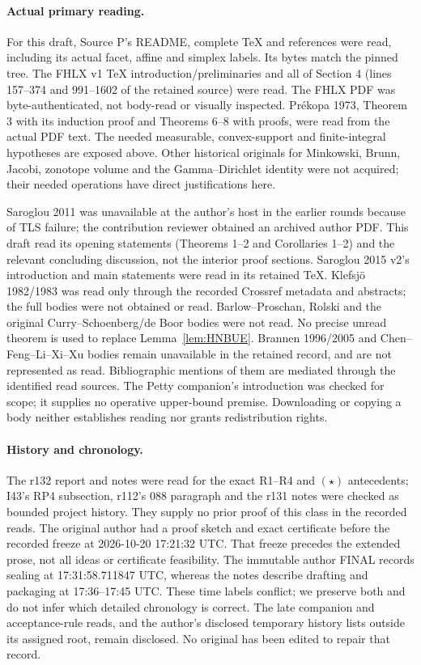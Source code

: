 \documentclass[11pt]{article}
\theoremstyle{remark}\newtheorem{remark}[theorem]{Remark}
\numberwithin{equation}{section}
\begin{document}
\paragraph{Actual primary reading.}
For this draft, Source P's README, complete TeX and references were read,
including its actual facet, affine and simplex labels. Its bytes match
the pinned tree. The FHLX v1 TeX introduction/preliminaries and all of
Section 4 (lines 157--374 and 991--1602 of the retained source) were read.
The FHLX PDF was byte-authenticated, not body-read or visually inspected.
Pr\'ekopa 1973, Theorem 3 with its induction proof and Theorems 6--8
with proofs, were read from the actual PDF text. The needed measurable,
convex-support and finite-integral hypotheses are exposed above.
Other historical originals for Minkowski, Brunn, Jacobi, zonotope volume
and the Gamma--Dirichlet identity were not acquired; their needed
operations have direct justifications here.

Saroglou 2011 was unavailable at the author's host in the earlier
rounds because of TLS failure; the contribution reviewer obtained an
archived author PDF. This draft read its opening statements (Theorems
1--2 and Corollaries 1--2) and the relevant concluding discussion, not
the interior proof sections. Saroglou 2015 v2's introduction and main
statements were read in its retained TeX. Klefsj\"o 1982/1983 was read
only through the recorded Crossref metadata and abstracts; the full
bodies were not obtained or read. Barlow--Proschan, Rolski and the
original Curry--Schoenberg/de Boor bodies were not read. No precise
unread theorem is used to replace Lemma~\ref{lem:HNBUE}.
Brannen 1996/2005 and Chen--Feng--Li--Xi--Xu bodies remain unavailable
in the retained record, and are not represented as read. Bibliographic
mentions of them are mediated through the identified read sources.
The Petty companion's introduction was checked for scope; it supplies
no operative upper-bound premise. Downloading or copying a body neither
establishes reading nor grants redistribution rights.

\paragraph{History and chronology.}
The r132 report and notes were read for the exact R1--R4 and $(\star)$
antecedents; I43's RP4 subsection, r112's 088 paragraph and the r131
notes were checked as bounded project history. They supply no prior
proof of this class in the recorded reads. The original author had a
proof sketch and exact certificate before the recorded freeze at
2026-10-20 17:21:32 UTC. That freeze precedes the extended prose, not
all ideas or certificate feasibility. The immutable author FINAL records
sealing at 17:31:58.711847 UTC, whereas the notes describe drafting and
packaging at 17:36--17:45 UTC. These time labels conflict; we preserve
both and do not infer which detailed chronology is correct.
The late companion and acceptance-rule reads, and the author's disclosed
temporary history lists outside its assigned root, remain disclosed.
No original has been edited to repair that record.
\end{document}

